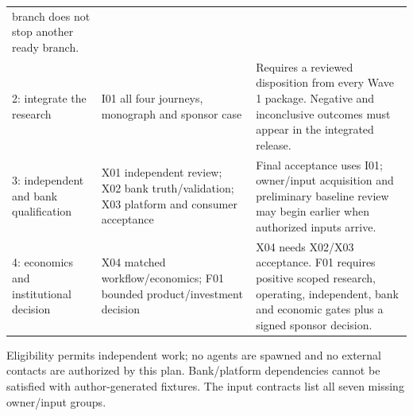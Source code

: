 \documentclass[
  11pt,
  a4paper,
]{article}
\begin{document}
\begin{longtable}[]{@{}lll@{}}
\begin{minipage}[t]{0.30\columnwidth}
branch does not stop another ready branch.\strut
\end{minipage}\tabularnewline
\begin{minipage}[t]{0.30\columnwidth}\raggedright
2: integrate the research\strut
\end{minipage} & \begin{minipage}[t]{0.30\columnwidth}\raggedright
I01 all four journeys, monograph and sponsor case\strut
\end{minipage} & \begin{minipage}[t]{0.30\columnwidth}\raggedright
Requires a reviewed disposition from every Wave 1 package. Negative and
inconclusive outcomes must appear in the integrated release.\strut
\end{minipage}\tabularnewline
\begin{minipage}[t]{0.30\columnwidth}\raggedright
3: independent and bank qualification\strut
\end{minipage} & \begin{minipage}[t]{0.30\columnwidth}\raggedright
X01 independent review; X02 bank truth/validation; X03 platform and
consumer acceptance\strut
\end{minipage} & \begin{minipage}[t]{0.30\columnwidth}\raggedright
Final acceptance uses I01; owner/input acquisition and preliminary
baseline review may begin earlier when authorized inputs arrive.\strut
\end{minipage}\tabularnewline
\begin{minipage}[t]{0.30\columnwidth}\raggedright
4: economics and institutional decision\strut
\end{minipage} & \begin{minipage}[t]{0.30\columnwidth}\raggedright
X04 matched workflow/economics; F01 bounded product/investment
decision\strut
\end{minipage} & \begin{minipage}[t]{0.30\columnwidth}\raggedright
X04 needs X02/X03 acceptance. F01 requires positive scoped research,
operating, independent, bank and economic gates plus a signed sponsor
decision.\strut
\end{minipage}\tabularnewline
\bottomrule
\end{longtable}

Eligibility permits independent work; no agents are spawned and no
external contacts are authorized by this plan. Bank/platform
dependencies cannot be satisfied with author-generated fixtures. The
input contracts list all seven missing owner/input groups.
\end{document}
